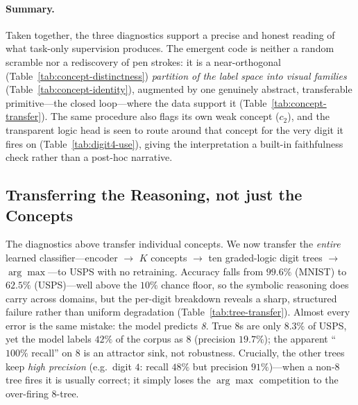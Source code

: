 \paragraph{Summary.}
Taken together, the three diagnostics support a precise and honest reading of
what task-only supervision produces. The emergent code is neither a random
scramble nor a rediscovery of pen strokes: it is a near-orthogonal
(Table~\ref{tab:concept-distinctness}) \emph{partition of the label space into
visual families} (Table~\ref{tab:concept-identity}), augmented by one genuinely
abstract, transferable primitive---the closed loop---where the data support it
(Table~\ref{tab:concept-transfer}). The same procedure also flags its own weak
concept ($c_2$), and the transparent logic head is seen to route around that
concept for the very digit it fires on (Table~\ref{tab:digit4-use}), giving the
interpretation a built-in faithfulness check rather than a post-hoc narrative.

\subsection{Transferring the Reasoning, not just the Concepts}
\label{sec:tree-transfer}

The diagnostics above transfer individual concepts. We now transfer the
\emph{entire} learned classifier---encoder $\rightarrow$ $K$ concepts
$\rightarrow$ ten graded-logic digit trees $\rightarrow$ $\arg\max$---to USPS
with no retraining. Accuracy falls from $99.6\%$ (MNIST) to $62.5\%$
(USPS)---well above the $10\%$ chance floor, so the symbolic reasoning does
carry across domains, but the per-digit breakdown reveals a sharp, structured
failure rather than uniform degradation (Table~\ref{tab:tree-transfer}). Almost
every error is the same mistake: the model predicts \emph{8}. True $8$s are only
$8.3\%$ of USPS, yet the model labels $42\%$ of the corpus as $8$ (precision
$19.7\%$); the apparent ``$100\%$ recall'' on $8$ is an attractor sink, not
robustness. Crucially, the other trees keep \emph{high precision} (e.g.\ digit
$4$: recall $48\%$ but precision $91\%$)---when a non-$8$ tree fires it is
usually correct; it simply loses the $\arg\max$ competition to the over-firing
$8$-tree.

